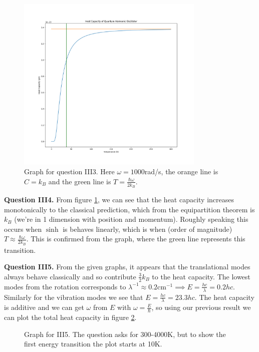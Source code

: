 \documentclass[letterpaper, reqno,11pt]{article}
\begin{document}
\begin{figure}[htpb]
    \centering
    \includegraphics[width=0.8\textwidth]{III3}
    \caption{Graph for question III3. Here $\omega=1000$rad/s, the orange line is $C=k_B$ and the green line is $T=\frac{\hbar\omega}{2k_B}$.}
    \label{fig:III3}
\end{figure}

{\medskip\noindent\bf Question III4.} From figure \ref{fig:III3}, we can see that the heat capacity increases monotonically to the classical prediction, which from the equipartition theorem is $k_B$ (we're in 1 dimension with position and momentum). Roughly speaking this occurs when $\sinh$ is behaves linearly, which is when (order of magnitude) $T\approx \frac{\hbar\omega}{2k_B}$. This is confirmed from the graph, where the green line represents this transition.

{\medskip\noindent\bf Question III5.} From the given graphs, it appears that the translational modes always behave classically and so contribute $\frac{3}{2}k_B$ to the heat capacity. The lowest modes from the rotation corresponds to $\lambda^{-1}\approx 0.2\text{cm}^{-1}\implies E=\frac{hc}{\lambda}=0.2hc$. Similarly for the vibration modes we see that $E=\frac{hc}{\lambda}=23.3hc$. The heat capacity is additive and we can get $\omega$ from $E$ with $\omega=\frac{E}{\hbar}$, so using our previous result we can plot the total heat capacity in figure \ref{fig:III5}.

\begin{figure}[htpb]
  \centering
  \caption{Graph for III5. The question asks for 300-4000K, but to show the first energy transition the plot starts at 10K.}
  \label{fig:III5}
\end{figure}
\end{document}
